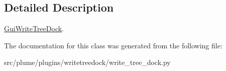 \subsection{Detailed Description}
\hyperlink{classplume-creator_1_1src_1_1plume_1_1plugins_1_1writetreedock_1_1write__tree__dock_1_1_gui_write_tree_dock}{Gui\+Write\+Tree\+Dock}. 

The documentation for this class was generated from the following file\+:\begin{DoxyCompactItemize}
\item 
src/plume/plugins/writetreedock/write\+\_\+tree\+\_\+dock.\+py\end{DoxyCompactItemize}
